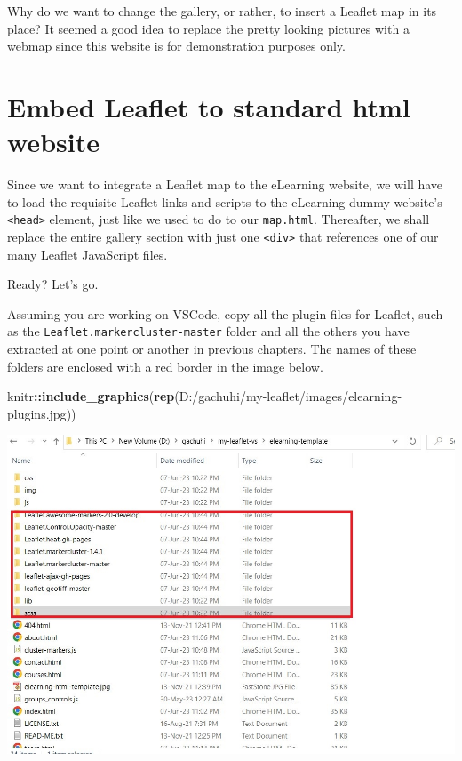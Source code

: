 \documentclass[
]{book}
\newenvironment{Shaded}{\begin{snugshade}}{\end{snugshade}}
\newcommand{\FunctionTok}[1]{\textcolor[rgb]{0.13,0.29,0.53}{\textbf{#1}}}
\newcommand{\NormalTok}[1]{#1}
\newcommand{\SpecialCharTok}[1]{\textcolor[rgb]{0.81,0.36,0.00}{\textbf{#1}}}
\newcommand{\StringTok}[1]{\textcolor[rgb]{0.31,0.60,0.02}{#1}}
\begin{document}
Why do we want to change the gallery, or rather, to insert a Leaflet map in its place? It seemed a good idea to replace the pretty looking pictures with a webmap since this website is for demonstration purposes only.

\hypertarget{embed-leaflet-to-standard-html-website}{%
\section{Embed Leaflet to standard html website}\label{embed-leaflet-to-standard-html-website}}

Since we want to integrate a Leaflet map to the eLearning website, we will have to load the requisite Leaflet links and scripts to the eLearning dummy website's \texttt{\textless{}head\textgreater{}} element, just like we used to do to our \texttt{map.html}. Thereafter, we shall replace the entire gallery section with just one \texttt{\textless{}div\textgreater{}} that references one of our many Leaflet JavaScript files.

Ready? Let's go.

Assuming you are working on VSCode, copy all the plugin files for Leaflet, such as the \texttt{Leaflet.markercluster-master} folder and all the others you have extracted at one point or another in previous chapters. The names of these folders are enclosed with a red border in the image below.

\begin{Shaded}
\begin{Highlighting}[]
\NormalTok{knitr}\SpecialCharTok{::}\FunctionTok{include\_graphics}\NormalTok{(}\FunctionTok{rep}\NormalTok{(}\StringTok{\textquotesingle{}D:/gachuhi/my{-}leaflet/images/elearning{-}plugins.jpg\textquotesingle{}}\NormalTok{))}
\end{Highlighting}
\end{Shaded}

\includegraphics{../images/elearning-plugins.jpg}
\end{document}
